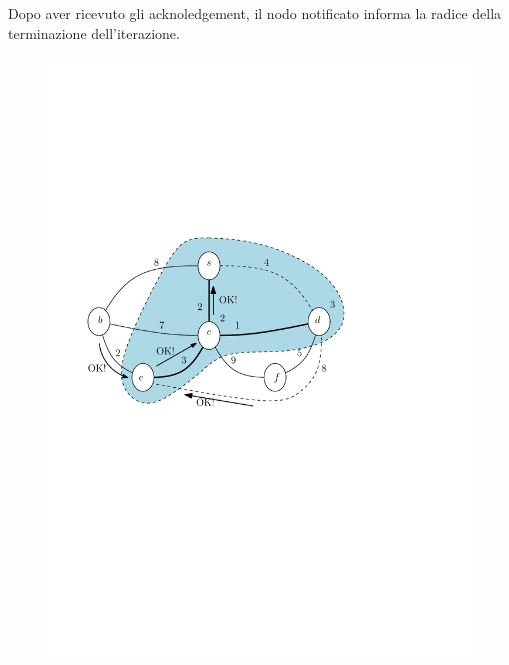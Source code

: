 \documentclass[10pt,xcolor=dvipsnames]{beamer}
\begin{document}
\begin{frame}
	\frametitle{}
	Dopo aver ricevuto gli acknoledgement, il nodo notificato
	informa la radice della terminazione dell'iterazione. 
	\begin{figure}[h]
	\centering
		\includegraphics[scale=0.6]{PT6.pdf}
	\end{figure}
\end{frame}
\end{document}
